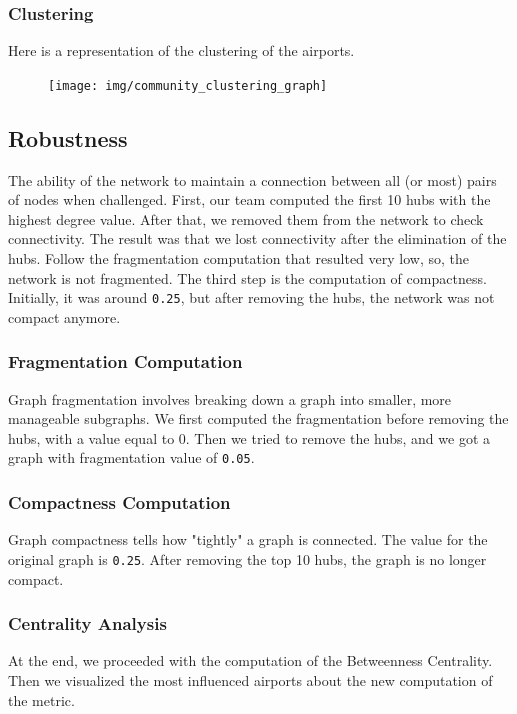 \documentclass[12pt]{article}
\begin{document}
    \subsubsection{Clustering}
    Here is a representation of the clustering of the airports.

    \begin{figure}[H]
        \centering
        \texttt{[image: img/community\_clustering\_graph]}
    \end{figure}

    \subsection{Robustness}\label{subsec:robustness}
    The ability of the network to maintain a connection between all (or most) pairs of nodes when challenged. First, our team computed the first 10 hubs with the highest degree value. After that, we removed them from the network to check connectivity. The result was that we lost connectivity after the elimination of the hubs. Follow the fragmentation computation that resulted very low, so, the network is not fragmented. The third step is the computation of compactness. Initially, it was around \texttt{0.25}, but after removing the hubs, the network was not compact anymore.

    \subsubsection{Fragmentation Computation}
    Graph fragmentation involves breaking down a graph into smaller, more manageable subgraphs. We first computed the fragmentation before removing the hubs, with a value equal to 0. Then we tried to remove the hubs, and we got a graph with fragmentation value of \texttt{0.05}.

    \subsubsection{Compactness Computation}
    Graph compactness tells how "tightly" a graph is connected. The value for the original graph is \texttt{0.25}. After removing the top 10 hubs, the graph is no longer compact.

    \subsubsection{Centrality Analysis}
    At the end, we proceeded with the computation of the Betweenness Centrality. Then we visualized the most influenced airports about the new computation of the metric.
\end{document}
